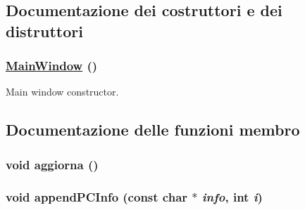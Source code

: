 \subsection{Documentazione dei costruttori e dei distruttori}
\hypertarget{classMainWindow_eb676574b78bda84d687fdcfd65d84a6}{
\subsubsection[MainWindow]{\setlength{\rightskip}{0pt plus 5cm}\hyperlink{classMainWindow}{Main\-Window} ()}}
\label{classMainWindow_eb676574b78bda84d687fdcfd65d84a6}


Main window constructor. 

\subsection{Documentazione delle funzioni membro}
\hypertarget{classMainWindow_2f955c2c4215bb50acc5d76e5fb99402}{
\subsubsection[aggiorna]{\setlength{\rightskip}{0pt plus 5cm}void aggiorna ()}}
\label{classMainWindow_2f955c2c4215bb50acc5d76e5fb99402}


\hypertarget{classMainWindow_9155ed247a9ce2d4084737e12be86e7b}{
\subsubsection[appendPCInfo]{\setlength{\rightskip}{0pt plus 5cm}void append\-PCInfo (const char $\ast$ {\em info}, int {\em i})}}
\label{classMainWindow_9155ed247a9ce2d4084737e12be86e7b}


